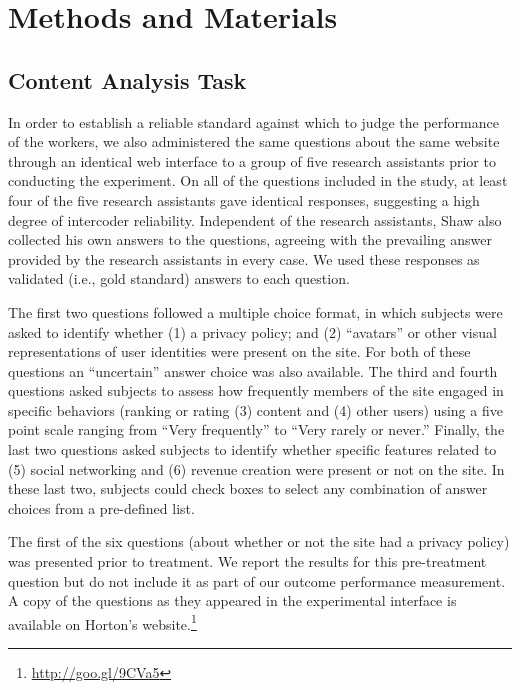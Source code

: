\documentclass{chi2009}
\begin{document}
\section{Methods and Materials}

\subsection{Content Analysis Task}

In order to establish a reliable standard against which to judge the
performance of the workers, we also administered the same questions
about the same website through an identical web interface to a group
of five research assistants prior to conducting the experiment. On all
of the questions included in the study, at least four of the five
research assistants gave identical responses, suggesting a high degree
of intercoder reliability. Independent of the research assistants,
Shaw also collected his own answers to the questions, agreeing
with the prevailing answer provided by the research assistants in
every case. We used these responses as validated (i.e., gold standard)
answers to each question.

The first two questions followed a multiple choice format, in which
subjects were asked to identify whether (1) a privacy policy; and (2)
``avatars'' or other visual representations of user identities were
present on the site. For both of these questions an ``uncertain''
answer choice was also available. The third and fourth questions asked
subjects to assess how frequently members of the site engaged in
specific behaviors (ranking or rating (3) content and (4) other users)
using a five point scale ranging from ``Very frequently'' to ``Very
rarely or never.''  Finally, the last two questions asked subjects to
identify whether specific features related to (5) social networking
and (6) revenue creation were present or not on the site. In these
last two, subjects could check boxes to select any combination of
answer choices from a pre-defined list.

The first of the six questions (about whether or not the site had a
privacy policy) was presented prior to treatment. We report the
results for this pre-treatment question but do not include it as part
of our outcome performance measurement.  A copy of the questions as they appeared in the experimental interface is
available on Horton's website.\footnote{\href{http://goo.gl/9CVa5}{http://goo.gl/9CVa5}
}
\end{document}
